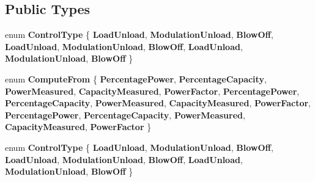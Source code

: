 \subsection*{Public Types}
\begin{DoxyCompactItemize}
\item 
\mbox{\label{class_compressed_air_centrifugal_base_a7bd6c25d4b8ac52181287addc5c951e7}} 
enum {\bfseries Control\+Type} \{ \newline
{\bfseries Load\+Unload}, 
{\bfseries Modulation\+Unload}, 
{\bfseries Blow\+Off}, 
{\bfseries Load\+Unload}, 
\newline
{\bfseries Modulation\+Unload}, 
{\bfseries Blow\+Off}, 
{\bfseries Load\+Unload}, 
{\bfseries Modulation\+Unload}, 
\newline
{\bfseries Blow\+Off}
 \}
\item 
\mbox{\label{class_compressed_air_centrifugal_base_a08a485bca80bf3fc298560a403328a8c}} 
enum {\bfseries Compute\+From} \{ \newline
{\bfseries Percentage\+Power}, 
{\bfseries Percentage\+Capacity}, 
{\bfseries Power\+Measured}, 
{\bfseries Capacity\+Measured}, 
\newline
{\bfseries Power\+Factor}, 
{\bfseries Percentage\+Power}, 
{\bfseries Percentage\+Capacity}, 
{\bfseries Power\+Measured}, 
\newline
{\bfseries Capacity\+Measured}, 
{\bfseries Power\+Factor}, 
{\bfseries Percentage\+Power}, 
{\bfseries Percentage\+Capacity}, 
\newline
{\bfseries Power\+Measured}, 
{\bfseries Capacity\+Measured}, 
{\bfseries Power\+Factor}
 \}
\item 
\mbox{\label{class_compressed_air_centrifugal_base_a7bd6c25d4b8ac52181287addc5c951e7}} 
enum {\bfseries Control\+Type} \{ \newline
{\bfseries Load\+Unload}, 
{\bfseries Modulation\+Unload}, 
{\bfseries Blow\+Off}, 
{\bfseries Load\+Unload}, 
\newline
{\bfseries Modulation\+Unload}, 
{\bfseries Blow\+Off}, 
{\bfseries Load\+Unload}, 
{\bfseries Modulation\+Unload}, 
\newline
{\bfseries Blow\+Off}
 \}
\item 
\mbox{\label{class_compressed_air_centrifugal_base_a08a485bca80bf3fc298560a403328a8c}} 

\end{DoxyCompactItemize}
